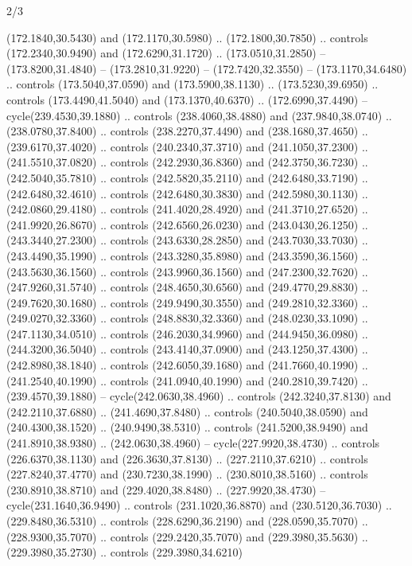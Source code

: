 \begin{flagdescription}{2/3}
\begin{scope}[xshift=0.5\flaglength,yshift=0.5\flagwidth,scale=\stretchfactor]
\begin{scope}[scale=0.001645\flagwidth,yshift=65mm,xshift=-63mm]
\begin{scope}[y=0.80pt, x=0.80pt, yscale=-1,]
\begin{scope}[cm={{1.33333,0.0,0.0,1.33333,(0.0,1e-05)}}]
  (172.1840,30.5430) and (172.1170,30.5980) .. (172.1800,30.7850) .. controls
  (172.2340,30.9490) and (172.6290,31.1720) .. (173.0510,31.2850) --
  (173.8200,31.4840) -- (173.2810,31.9220) -- (172.7420,32.3550) --
  (173.1170,34.6480) .. controls (173.5040,37.0590) and (173.5900,38.1130) ..
  (173.5230,39.6950) .. controls (173.4490,41.5040) and (173.1370,40.6370) ..
  (172.6990,37.4490) -- cycle(239.4530,39.1880) .. controls (238.4060,38.4880)
  and (237.9840,38.0740) .. (238.0780,37.8400) .. controls (238.2270,37.4490)
  and (238.1680,37.4650) .. (239.6170,37.4020) .. controls (240.2340,37.3710)
  and (241.1050,37.2300) .. (241.5510,37.0820) .. controls (242.2930,36.8360)
  and (242.3750,36.7230) .. (242.5040,35.7810) .. controls (242.5820,35.2110)
  and (242.6480,33.7190) .. (242.6480,32.4610) .. controls (242.6480,30.3830)
  and (242.5980,30.1130) .. (242.0860,29.4180) .. controls (241.4020,28.4920)
  and (241.3710,27.6520) .. (241.9920,26.8670) .. controls (242.6560,26.0230)
  and (243.0430,26.1250) .. (243.3440,27.2300) .. controls (243.6330,28.2850)
  and (243.7030,33.7030) .. (243.4490,35.1990) .. controls (243.3280,35.8980)
  and (243.3590,36.1560) .. (243.5630,36.1560) .. controls (243.9960,36.1560)
  and (247.2300,32.7620) .. (247.9260,31.5740) .. controls (248.4650,30.6560)
  and (249.4770,29.8830) .. (249.7620,30.1680) .. controls (249.9490,30.3550)
  and (249.2810,32.3360) .. (249.0270,32.3360) .. controls (248.8830,32.3360)
  and (248.0230,33.1090) .. (247.1130,34.0510) .. controls (246.2030,34.9960)
  and (244.9450,36.0980) .. (244.3200,36.5040) .. controls (243.4140,37.0900)
  and (243.1250,37.4300) .. (242.8980,38.1840) .. controls (242.6050,39.1680)
  and (241.7660,40.1990) .. (241.2540,40.1990) .. controls (241.0940,40.1990)
  and (240.2810,39.7420) .. (239.4570,39.1880) -- cycle(242.0630,38.4960) ..
  controls (242.3240,37.8130) and (242.2110,37.6880) .. (241.4690,37.8480) ..
  controls (240.5040,38.0590) and (240.4300,38.1520) .. (240.9490,38.5310) ..
  controls (241.5200,38.9490) and (241.8910,38.9380) .. (242.0630,38.4960) --
  cycle(227.9920,38.4730) .. controls (226.6370,38.1130) and (226.3630,37.8130)
  .. (227.2110,37.6210) .. controls (227.8240,37.4770) and (230.7230,38.1990) ..
  (230.8010,38.5160) .. controls (230.8910,38.8710) and (229.4020,38.8480) ..
  (227.9920,38.4730) -- cycle(231.1640,36.9490) .. controls (231.1020,36.8870)
  and (230.5120,36.7030) .. (229.8480,36.5310) .. controls (228.6290,36.2190)
  and (228.0590,35.7070) .. (228.9300,35.7070) .. controls (229.2420,35.7070)
  and (229.3980,35.5630) .. (229.3980,35.2730) .. controls (229.3980,34.6210)

\end{scope}
\end{scope}
\end{scope}
\end{scope}
\end{flagdescription}
